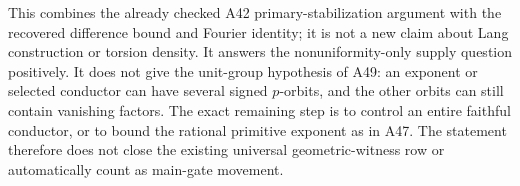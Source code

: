 This combines the already checked A42 primary-stabilization
argument with the recovered difference bound and Fourier identity;
it is not a new claim about Lang construction or torsion density.
It answers the nonuniformity-only supply question positively.
It does not give the unit-group hypothesis of A49: an exponent
or selected conductor can have several signed $p$-orbits, and
the other orbits can still contain vanishing factors. The exact
remaining step is to control an entire faithful conductor,
or to bound the rational primitive exponent as in A47.
The statement therefore does not close the existing universal
geometric-witness row or automatically count as main-gate movement.
